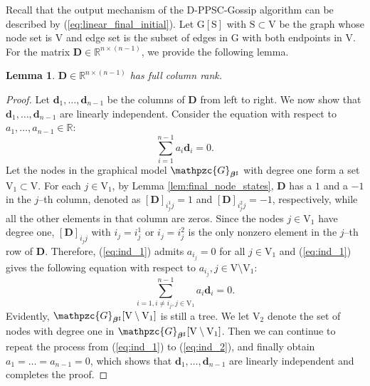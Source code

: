 \documentclass[a4paper, 11pt]{article}
\newcommand{\R}{\mathbb{R}}
\newcommand{\1}{\mathbf{1}}
\newcommand{\Db}{\mathbf{D}}
\newcommand{\mG}{\mathrm{G}}
\newcommand{\mV}{\mathrm{V}}
\newcommand{\mGM}{\mathpzc{G}}
\newcommand{\betab}{\bm{\beta}}
\newtheorem{lemma}{Lemma}
\begin{document}
Recall that the output mechanism of the D-PPSC-Gossip algorithm can be described by (\ref{eq:linear_final_initial}).
Let $\mG[\mathrm{S}]$ with $\mathrm{S}\subset\mV$ be the graph whose node set is $\mV$ and edge set is the subset of edges in $\mG$ with both endpoints in $\mV$. For the matrix $\Db\in\R^{n\times(n-1)}$, we provide the following lemma.
\begin{lemma}\label{lem:D}
	$\Db\in\R^{n\times(n-1)}$ has full column rank.
\end{lemma}
\begin{proof}
	Let $\mathbf{d}_1,\dots,\mathbf{d}_{n-1}$ be the columns of $\Db$ from left to right. We now show that $\mathbf{d}_1,\dots,\mathbf{d}_{n-1}$ are linearly independent. Consider the equation with respect to $a_1,\dots,a_{n-1}\in\R$:
	\begin{equation}\label{eq:ind_1}
	\sum\limits_{i=1}^{n-1}a_i\mathbf{d}_i = 0.
	\end{equation}
	Let the nodes in the graphical model $\mGM_{\betab^\sharp}$ with degree one form a set $\mV_1\subset\mV$. For each $j\in\mV_1$, by Lemma \ref{lem:final_node_states}, $\Db$ has a $1$ and a $-1$ in the $j$--th column, denoted as $[\Db]_{i^1_jj}=1$ and $[\Db]_{i^2_jj}=-1$, respectively, while all the other elements in that column are zeros. Since the nodes $j\in\mV_1$ have degree one, $[\Db]_{i_jj}$ with $i_j=i^1_j$ or $i_j=i^2_j$ is the only nonzero element in the $j$--th row of $\Db$. Therefore, (\ref{eq:ind_1}) admits $a_{i_j}=0$ for all $j\in\mV_1$ and (\ref{eq:ind_1}) gives the following equation with respect to $a_{i_j},j\in\mV\setminus\mV_1$:
	\begin{equation}\label{eq:ind_2}
	\sum\limits_{i=1,i\neq i_j,j\in\mV_1}^{n-1} a_i\mathbf{d}_i = 0.
	\end{equation}
	Evidently, $\mGM_{\betab^\sharp}[\mV\setminus\mV_1]$ is still a tree. We let $\mV_2$ denote the set of nodes with degree one in $\mGM_{\betab^\sharp}[\mV\setminus\mV_1]$. Then we can continue to repeat the process from (\ref{eq:ind_1}) to (\ref{eq:ind_2}), and finally obtain $a_1=\dots=a_{n-1}=0$, which shows that $\mathbf{d}_1,\dots,\mathbf{d}_{n-1}$ are linearly independent and completes the proof.
\end{proof}
\end{document}
